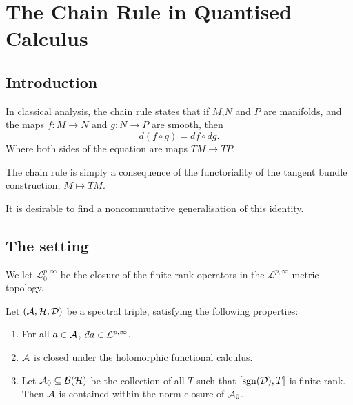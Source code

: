 
\chapter{The Chain Rule in Quantised Calculus} %

\label{Chapter6} %



\section{Introduction}
In classical analysis, the chain rule states that if $M$,$N$ and $P$ are manifolds, 
 and the maps $f:M\rightarrow N$ and $g:N\rightarrow P$ are smooth, then
\begin{equation*}
    d(f\circ g) = df \circ dg.
\end{equation*}
Where both sides of the equation are maps $TM\rightarrow TP$.

\begin{remark}
    The chain rule is simply a consequence of the functoriality of the tangent
    bundle construction, $M\mapsto TM$.
\end{remark}

 It is desirable
to find a noncommutative generalisation of this identity.


\section{The setting}
We let $\mathcal{L}^{p,\infty}_0$ be the closure of the finite rank
operators in the $\mathcal{L}^{p,\infty}$-metric topology.

Let $(\mathcal{A},\mathcal{H},\mathcal{D})$ be a spectral triple, satisfying the following properties:
\begin{enumerate}
    \item{} For all $a \in \mathcal{A}$, $\qd a \in \mathcal{L}^{p,\infty}$.
    \item{} $\mathcal{A}$ is closed under the holomorphic functional calculus.
    \item{} Let $\mathcal{A}_0 \subseteq \mathcal{B}(\mathcal{H})$ be the collection of all
    $T$ such that $[\operatorname{sgn}(\mathcal{D}),T]$ is finite rank. Then $\mathcal{A}$ is contained
    within the norm-closure of $\mathcal{A}_0$.
\end{enumerate}

